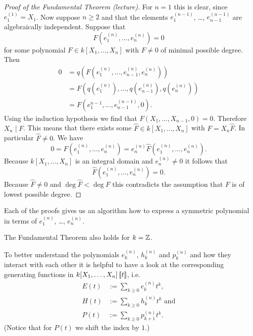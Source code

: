 \begin{proof}[Proof of the Fundamental Theorem (lecture)]
  For $n = 1$ this is clear, since $e^{(1)}_1 = X_1$. Now suppose $n \geq 2$ and that the elements $e^{(n-1)}_1$, \dots, $e^{(n-1)}_{n-1}$ are algebraically independent. Suppose that
  \[
   F\left(e^{(n)}_1, \dotsc, e^{(n)}_n\right) = 0
  \]
  for some polynomial $F \in k[X_1, \dotsc, X_n]$ with $F \neq 0$ of minimal possible degree. Then
  \begin{align*}
   0
   &= q\left(F\left(e^{(n)}_1, \dotsc, e^{(n)}_{n-1} ,e^{(n)}_n\right)\right) \\
   &= F\left( q\left(e^{(n)}_1\right), \dotsc, q\left(e^{(n)}_{n-1}\right), q\left(e^{(n)}_n\right) \right) \\
   &= F\left( e^{n-1}_1, \dotsc, e^{(n-1)}_{n-1}, 0 \right).
  \end{align*}
  Using the induction hypothesis we find that $F(X_1, \dotsc, X_{n-1}, 0) = 0$. Therefore $X_n \mid F$. This means that there exists some $\hat{F} \in k[X_1, \dotsc, X_n]$ with $F = X_n \hat{F}$. In particular $\hat{F} \neq 0$. We have
  \[
   0
   = F\left(e^{(n)}_1, \dotsc, e^{(n)}_n\right)
   = e^{(n)}_n \hat{F}\left(e^{(n)}_1, \dotsc, e^{(n)}_n\right).
  \]
  Because $k[X_1, \dotsc, X_n]$ is an integral domain and $e^{(n)}_n \neq 0$ it follows that
  \[
   \hat{F}\left(e^{(n)}_1, \dotsc, e^{(n)}_n\right) = 0.
  \]
  Because $\hat{F} \neq 0$ and $\deg \hat{F} < \deg F$ this contradicts the assumption that $F$ is of lowest possible degree.
\end{proof}


\begin{rem}
 Each of the proofs gives us an algorithm how to express a symmetric polynomial in terms of $e^{(n)}_1$, \dots, $e^{(n)}_n$.
\end{rem}


\begin{rem}
 The Fundamental Theorem also holds for $k = \mathbb{Z}$.
\end{rem}


To better understand the polynomials $e^{(n)}_k$, $h^{(n)}_k$ and $p^{(n)}_k$ and how they interact with each other it is helpful to have a look at the corresponding generating functions in $k[X_1, \dotsc, X_n]\left[\!\left[t\right]\!\right]$, i.e.
\begin{align*}
 E(t) &:= \sum_{k \geq 0} e^{(n)}_k t^k, \\
 H(t) &:= \sum_{k \geq 0} h^{(n)}_k t^k \text{ and} \\
 P(t) &:= \sum_{k \geq 0} p^{(n)}_{k+1} t^k.
\end{align*}
(Notice that for $P(t)$ we shift the index by $1$.)


